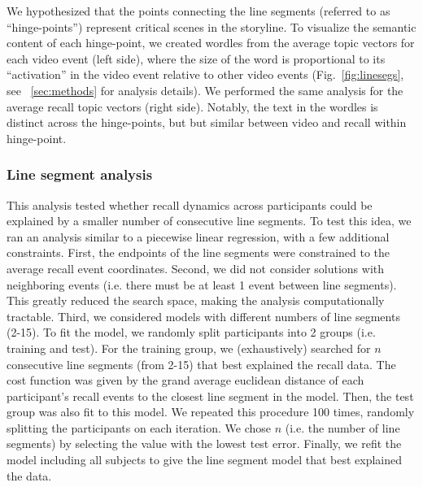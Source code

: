 We hypothesized that the points connecting the line segments (referred to as ``hinge-points'') represent critical scenes in the storyline. To visualize the semantic content of each hinge-point, we created wordles from the average topic vectors for each video event (left side), where the size of the word is proportional to its ``activation'' in the video event relative to other video events (Fig.~\ref{fig:linesegs}, see ~\ref{sec:methods} for analysis details). We performed the same analysis for the average recall topic vectors (right side). Notably, the text in the wordles is distinct across the hinge-points, but but similar between video and recall within hinge-point.

\subsubsection{Line segment analysis}
This analysis tested whether recall dynamics across participants could be explained by a smaller number of consecutive line segments.  To test this idea, we ran an analysis similar to a piecewise linear regression, with a few additional constraints. First, the endpoints of the line segments were constrained to the average recall event coordinates. Second, we did not consider solutions with neighboring events (i.e. there must be at least 1 event between line segments).  This greatly reduced the search space, making the analysis computationally tractable.  Third, we considered models with different numbers of line segments (2-15).  To fit the model, we randomly split participants into 2 groups (i.e. training and test). For the training group, we (exhaustively) searched for $n$ consecutive line segments (from 2-15) that best explained the recall data. The cost function was given by the grand average euclidean distance of each participant's recall events to the closest line segment in the model. Then, the test group was also fit to this model.  We repeated this procedure 100 times, randomly splitting the participants on each iteration.  We chose $n$ (i.e. the number of line segments) by selecting the value with the lowest test error.  Finally, we refit the model including all subjects to give the line segment model that best explained the data.

